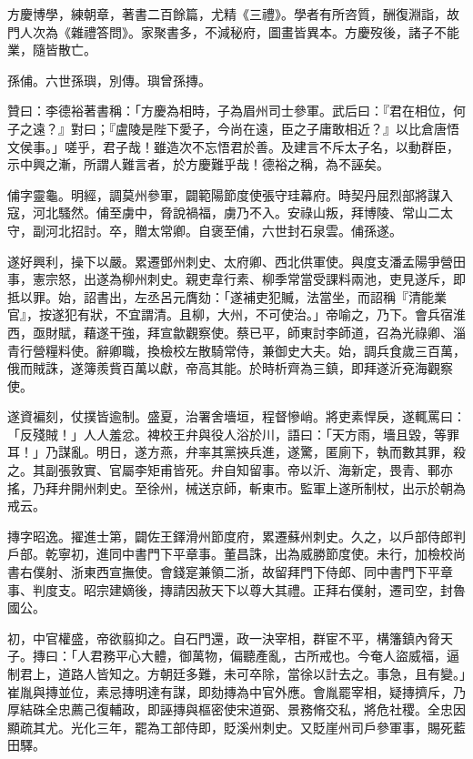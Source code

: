 \begin{pinyinscope}
 方慶博學，練朝章，著書二百餘篇，尤精《三禮》。學者有所咨質，酬復淵詣，故門人次為《雜禮答問》。家聚書多，不減秘府，圖畫皆異本。方慶歿後，諸子不能業，隨皆散亡。



 孫俌。六世孫璵，別傳。璵曾孫摶。



 贊曰：李德裕著書稱：「方慶為相時，子為眉州司士參軍。武后曰：『君在相位，何子之遠？』對曰；『盧陵是陛下愛子，今尚在遠，臣之子庸敢相近？』以比倉唐悟文侯事。」嗟乎，君子哉！雖造次不忘悟君於善。及建言不斥太子名，以動群臣，示中興之漸，所謂人難言者，於方慶難乎哉！德裕之稱，為不誣矣。



 俌字靈龜。明經，調莫州參軍，闢範陽節度使張守珪幕府。時契丹屈烈部將謀入寇，河北騷然。俌至虜中，脅說禍福，虜乃不入。安祿山叛，拜博陵、常山二太守，副河北招討。卒，贈太常卿。自褒至俌，六世封石泉雲。俌孫遂。



 遂好興利，操下以嚴。累遷鄧州刺史、太府卿、西北供軍使。與度支潘孟陽爭營田事，憲宗怒，出遂為柳州刺史。親吏韋行素、柳季常當受課料兩池，吏見遂斥，即抵以罪。始，詔書出，左丞呂元膺劾：「遂補吏犯贓，法當坐，而詔稱『清能業官』，按遂犯有狀，不宜謂清。且柳，大州，不可使治。」帝喻之，乃下。會兵宿淮西，亟財賦，藉遂干強，拜宣歙觀察使。蔡已平，師東討李師道，召為光祿卿、淄青行營糧料使。辭卿職，換檢校左散騎常侍，兼御史大夫。始，調兵食歲三百萬，俄而賊誅，遂簿羨貲百萬以獻，帝高其能。於時析齊為三鎮，即拜遂沂兗海觀察使。



 遂資褊刻，仗撲皆逾制。盛夏，治署舍墻垣，程督慘峭。將吏素悍戾，遂輒罵曰：「反殘賊！」人人羞忿。裨校王弁與役人浴於川，語曰：「天方雨，墻且毀，等罪耳！」乃謀亂。明日，遂方燕，弁率其黨挾兵進，遂驚，匿廁下，執而數其罪，殺之。其副張敦實、官屬李矩甫皆死。弁自知留事。帝以沂、海新定，畏青、鄆亦搖，乃拜弁開州刺史。至徐州，械送京師，斬東市。監軍上遂所制杖，出示於朝為戒云。



 摶字昭逸。擢進士第，闢佐王鐸滑州節度府，累遷蘇州刺史。久之，以戶部侍郎判戶部。乾寧初，進同中書門下平章事。董昌誅，出為威勝節度使。未行，加檢校尚書右僕射、浙東西宣撫使。會錢寔兼領二浙，故留拜門下侍郎、同中書門下平章事、判度支。昭宗建嫡後，摶請因赦天下以尊大其禮。正拜右僕射，遷司空，封魯國公。



 初，中官權盛，帝欲翦抑之。自石門還，政一決宰相，群宦不平，構籓鎮內脅天子。摶曰：「人君務平心大體，御萬物，偏聽產亂，古所戒也。今奄人盜威福，逼制君上，道路人皆知之。方朝廷多難，未可卒除，當徐以計去之。事急，且有變。」崔胤與摶並位，素忌摶明達有謀，即劾摶為中官外應。會胤罷宰相，疑摶擠斥，乃厚結硃全忠薦己復輔政，即誣摶與樞密使宋道弼、景務脩交私，將危社稷。全忠因顯疏其尤。光化三年，罷為工部侍即，貶溪州刺史。又貶崖州司戶參軍事，賜死藍田驛。




\end{pinyinscope}
